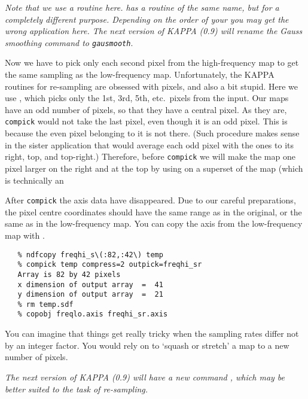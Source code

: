    {\it Note that we use a
   routine here.
   has a routine of the same name, but for a completely different
   purpose. Depending on the order of your
   you may get the wrong application here.
   The next version of KAPPA (0.9) will rename the Gauss smoothing
   command to\/ \tt gausmooth}.

   Now we have to pick only each second pixel from the high-frequency
   map to get the same sampling as the low-frequency map. Unfortunately,
   the KAPPA routines for re-sampling are obsessed with pixels, and also
   a bit stupid. Here we use
{\tt {}},
   which picks only
   the 1st, 3rd, 5th, etc.\ pixels from the input. Our maps have an
   odd number of pixels, so that they have a central pixel. As they are,
   {\tt compick} would not take the last pixel, even though it is an
   odd pixel. This is because the even pixel belonging to it is
   not there. (Such procedure makes sense in the sister application
{\tt {}}
   that would average each odd pixel with the ones to
   its right, top, and top-right.)
   Therefore, before {\tt compick} we
   will make the map one pixel larger on the right and at the top by
   using
{\tt {}}
   on a superset of the map (which is technically an

   After {\tt compick} the axis data have disappeared. Due to our
   careful preparations, the pixel centre coordinates should have the
   same range as in the original, or the same as in the low-frequency
   map. You can copy the axis from the low-frequency map with
{\tt {}}.

\begin{verbatim}
   % ndfcopy freqhi_s\(:82,:42\) temp
   % compick temp compress=2 outpick=freqhi_sr
   Array is 82 by 42 pixels
   x dimension of output array  =  41
   y dimension of output array  =  21
   % rm temp.sdf
   % copobj freqlo.axis freqhi_sr.axis
\end{verbatim}

   You can imagine that things get really tricky when the sampling rates
   differ not by an integer factor. You would rely on
{\tt {}}
   to `squash or stretch' a map to a new number of pixels.

   {\it The next version of KAPPA (0.9) will have a new command\/
{\tt {}},
   which may be better suited to the task of re-sampling.}

